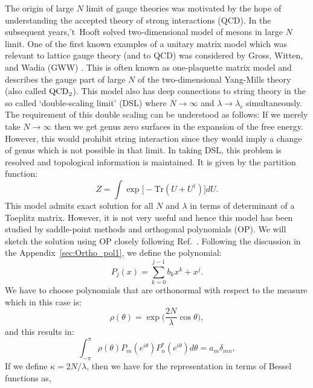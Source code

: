\documentclass[11pt]{article}
\begin{document}
The origin of large $N$ limit of gauge theories was motivated by the hope of understanding 
the accepted theory of strong interactions (QCD). 
In the subsequent years,'t~Hooft solved two-dimensional model of mesons in large $N$ 
limit. One of the first known examples of a unitary matrix model which was relevant to 
lattice gauge theory (and to QCD) was considered by Gross, Witten, and 
Wadia (GWW) \cite{Gross:1980he, Wadia:2012fr}.
This is often known as one-plaquette matrix model and describes 
the gauge part of large $N$ of the two-dimensional Yang-Mills theory (also called $\rm{QCD}_{2}$).
This model also has deep connections to string theory in the so 
called `double-scaling limit' (DSL) where $N \to \infty$ and $\lambda \to \lambda_{c}$ 
simultaneously. The requirement of this double scaling can be understood as follows: 
If we merely take $N \to \infty$ then we get genus zero surfaces in the 
expansion of the free energy. However, this would prohibit string interaction 
since they would imply a change of genus which is not possible in that limit. 
In taking DSL, this problem is resolved and topological information is maintained. 
It is given by the partition function: 
\begin{equation}
	Z = \int \exp \Big[- \mbox{Tr} (U + U^{\dagger})   \Big] dU. 
\end{equation}
This model admits exact solution for all $N$ and $\lambda$ in terms of determinant of a 
Toeplitz matrix. However, it is not very useful and hence this model has been studied by 
saddle-point methods and orthogonal polynomials (OP). We will sketch the solution using OP 
closely following Ref.~\cite{Goldschmidt:1979hq}. 
Following the discussion in the Appendix~\ref{sec:Ortho_pol1}, we define the polynomial:
\begin{equation}
	P_{j}(x) = \sum_{k=0}^{j-1} b_{k} x^{k} + x^{j}. 
\end{equation} 
We have to choose polynomials that are orthonormal with respect to the measure which in this case is:
\begin{equation}
	\rho(\theta) = \exp\Big(\frac{2N}{\lambda} \cos \theta \Big),
\end{equation}
and this results in:
\begin{equation}
	\int_{-\pi}^{\pi} \rho(\theta) P_{m}(e^{i\theta}) P_{n}^{*}(e^{i\theta}) d\theta= a_{m} \delta_{mn},
\end{equation}
If we define $\kappa = 2N/\lambda$, then we have for the representation in terms of 
Bessel functions as, 
\end{document}
